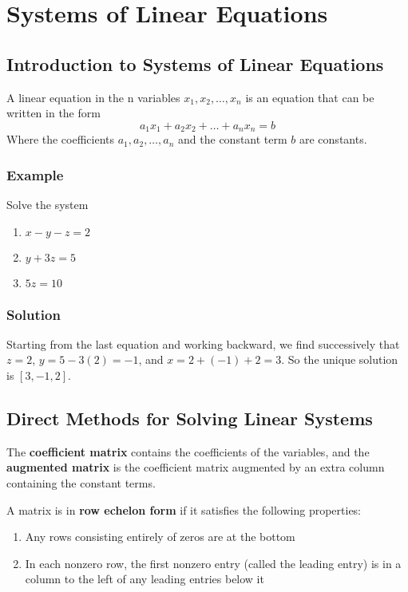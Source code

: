 \chapter{Systems of Linear Equations}

\section{Introduction to Systems of Linear Equations}
A linear equation in the n variables $x_1, x_2, \dots , x_n$ is an equation
that can be written in the form
$$a_1x_1+a_2x_2+\dots+a_nx_n=b$$
Where the coefficients $a_1, a_2, \dots , a_n$ and the constant term $b$ are constants.

\subsection*{Example}
Solve the system
\begin{enumerate}
    \item[] $x-y-z=2$
    \item[] $y+3z=5$
    \item[] $5z=10$
\end{enumerate}

\subsection*{Solution}
Starting from the last equation and working backward, we find successively that
$z=2$, $y=5-3(2)=-1$, and $x=2+(-1)+2=3$. So the unique solution is $[3,-1,2]$.

\section{Direct Methods for Solving Linear Systems}
The \textbf{coefficient matrix} contains the coefficients of the variables, and
the \textbf{augmented matrix} is the coefficient matrix augmented by an extra column
containing the constant terms.

A matrix is in \textbf{row echelon form} if it satisfies the following properties:
\begin{enumerate}
    \item Any rows consisting entirely of zeros are at the bottom
    \item In each nonzero row, the first nonzero entry (called the leading entry)
          is in a column to the left of any leading entries below it
\end{enumerate}


